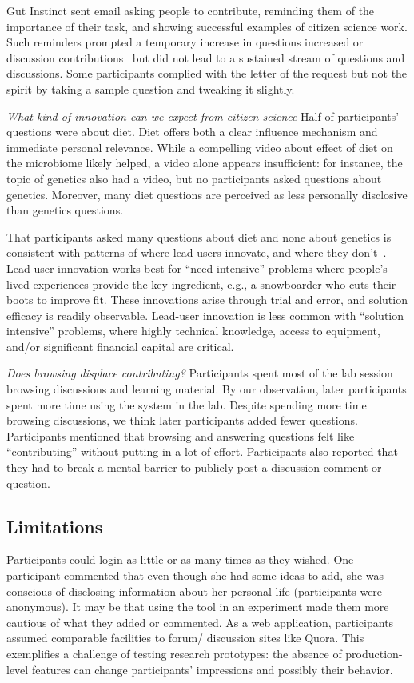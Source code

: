 Gut Instinct sent email asking people to contribute, reminding them of the importance of their task, and showing successful examples of citizen science work. Such reminders 
prompted a temporary increase in questions increased or discussion contributions~\cite{Kotturi2015} but did not lead to a sustained stream of questions and discussions. Some participants complied with the letter of the request but not the spirit by taking a sample question and tweaking it slightly.

\textit{What kind of innovation can we expect from citizen science}
Half of participants’ questions were about diet. Diet offers both a clear influence mechanism and immediate personal relevance. While a compelling video about effect of diet on the microbiome likely helped, a video alone appears insufficient: for instance, the topic of genetics also had a video, but no participants asked questions about genetics. Moreover, many diet questions are perceived as less personally disclosive than genetics questions.
 
That participants asked many questions about diet and none about genetics is consistent with patterns of where lead users innovate, and where they don’t~\cite{VonHippel2005a}. Lead-user innovation works best for “need-intensive” problems where people’s lived experiences provide the key ingredient, e.g., a snowboarder who cuts their boots to improve fit. These innovations arise through trial and error, and solution efficacy is readily observable. Lead-user innovation is less common with “solution intensive” problems, where highly technical knowledge, access to equipment, and/or significant financial capital are critical. 
 
\textit{Does browsing displace contributing?}
Participants spent most of the lab session browsing discussions and learning material. By our observation, later participants spent more time using the system in the lab. Despite spending more time browsing discussions, we think later participants added fewer questions. Participants mentioned that browsing and answering questions felt like “contributing” without putting in a lot of effort. Participants also reported that they had to break a mental barrier to publicly post a discussion comment or question. 

\subsection{Limitations}
Participants could login as little or as many times as they wished. One participant commented that even though she had some ideas to add, she was conscious of disclosing information about her personal life (participants were anonymous). It may be that using the tool in an experiment made them more cautious of what they added or commented.
As a web application, participants assumed comparable facilities to forum/ discussion sites like Quora. This exemplifies a challenge of testing research prototypes: the absence of production-level features can change participants’ impressions and possibly their behavior.

